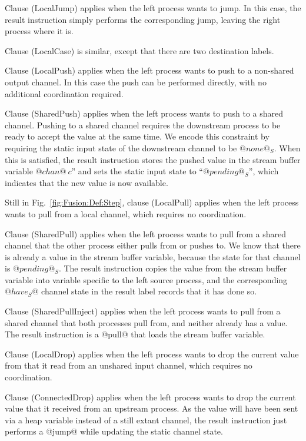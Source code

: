 Clause (LocalJump) applies when the left process wants to jump.
In this case, the result instruction simply performs the corresponding jump, leaving the right process where it is. 

Clause (LocalCase) is similar, except that there are two destination labels.

Clause (LocalPush) applies when the left process wants to push to a non-shared output channel.
In this case the push can be performed directly, with no additional coordination required.

Clause (SharedPush) applies when the left process wants to push to a shared channel. Pushing to a shared channel requires the downstream process to be ready to accept the value at the same time. We encode this constraint by requiring the static input state of the downstream channel to be $@none@_S$. When this is satisfied, the result instruction stores the pushed value in the stream buffer variable $@chan@~c$'' and sets the static input state to ``$@pending@_S$'', which indicates that the new value is now available. 

\eject{}
Still in Fig.~\ref{fig:Fusion:Def:Step}, clause (LocalPull) applies when the left process wants to pull from a local channel, which requires no coordination.

Clause (SharedPull) applies when the left process wants to pull from a shared channel that the other process either pulls from or pushes to. We know that there is already a value in the stream buffer variable, because the state for that channel is $@pending@_S$. The result instruction copies the value from the stream buffer variable into variable specific to the left source process, and the corresponding $@have_S@$ channel state in the result label records that it has done so.

Clause (SharedPullInject) applies when the left process wants to pull from a shared channel that both processes pull from, and neither already has a value. The result instruction is a @pull@ that loads the stream buffer variable.

Clause (LocalDrop) applies when the left process wants to drop the current value from that it read from an unshared input channel, which requires no coordination.

Clause (ConnectedDrop) applies when the left process wants to drop the current value that it received from an upstream process. As the value will have been sent via a heap variable instead of a still extant channel, the result instruction just performs a @jump@ while updating the static channel state.

